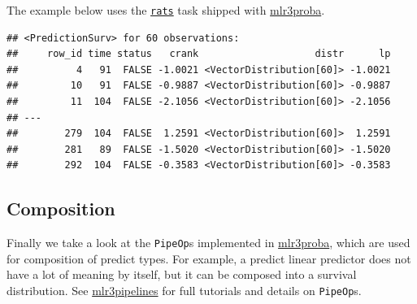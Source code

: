 \documentclass[]{scrbook}
\newenvironment{Shaded}{\begin{snugshade}}{\end{snugshade}}
\newcommand{\DataTypeTok}[1]{\textcolor[rgb]{0.13,0.29,0.53}{#1}}
\newcommand{\FloatTok}[1]{\textcolor[rgb]{0.00,0.00,0.81}{#1}}
\newcommand{\KeywordTok}[1]{\textcolor[rgb]{0.13,0.29,0.53}{\textbf{#1}}}
\newcommand{\NormalTok}[1]{#1}
\newcommand{\OperatorTok}[1]{\textcolor[rgb]{0.81,0.36,0.00}{\textbf{#1}}}
\newcommand{\StringTok}[1]{\textcolor[rgb]{0.31,0.60,0.02}{#1}}
\renewenvironment{Shaded} {\begin{snugshade}\small} {\end{snugshade}}
\begin{document}
The example below uses the \href{https://mlr3proba.mlr-org.com/reference/mlr_tasks_rats.html}{\texttt{rats}} task shipped with \href{https://mlr3proba.mlr-org.com}{mlr3proba}.

\begin{Shaded}
\end{Shaded}

\begin{verbatim}
## <PredictionSurv> for 60 observations:
##     row_id time status   crank                    distr      lp
##          4   91  FALSE -1.0021 <VectorDistribution[60]> -1.0021
##         10   91  FALSE -0.9887 <VectorDistribution[60]> -0.9887
##         11  104  FALSE -2.1056 <VectorDistribution[60]> -2.1056
## ---                                                            
##        279  104  FALSE  1.2591 <VectorDistribution[60]>  1.2591
##        281   89  FALSE -1.5020 <VectorDistribution[60]> -1.5020
##        292  104  FALSE -0.3583 <VectorDistribution[60]> -0.3583
\end{verbatim}

\hypertarget{composition}{%
\subsection{Composition}\label{composition}}

Finally we take a look at the \texttt{PipeOp}s implemented in \href{https://mlr3proba.mlr-org.com}{mlr3proba}, which are used for composition of predict types.
For example, a predict linear predictor does not have a lot of meaning by itself, but it can be composed into a survival distribution.
See \href{https://mlr3pipelines.mlr-org.com}{mlr3pipelines} for full tutorials and details on \texttt{PipeOp}s.
\end{document}
